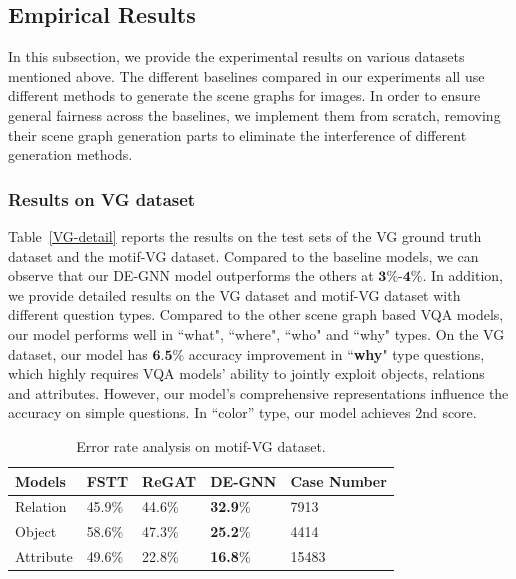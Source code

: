 \documentclass[letterpaper]{article} %
\begin{document}
\subsection{Empirical Results}
In this subsection, we provide the experimental results on various datasets mentioned above. 
The different baselines compared in our experiments all use different methods to generate the scene graphs for images. 
In order to ensure general fairness across the baselines, we implement them from scratch, removing their scene graph generation parts to eliminate the interference of different generation methods.

\subsubsection{Results on VG dataset} Table~\ref{VG-detail} reports the results on the test sets of the VG ground truth dataset and the motif-VG dataset. Compared to the baseline models, we can observe that our DE-GNN model outperforms the others at $\textbf{3\%}$-$\textbf{4\%}$. In addition, we provide detailed results on the VG dataset and motif-VG dataset with different question types. Compared to the other scene graph based VQA models, our model performs well in ``what", ``where", ``who" and ``why" types. On the VG dataset, our model has $\textbf{6.5\%}$ accuracy improvement in ``\textbf{why}" type questions, which highly requires VQA models' ability to jointly exploit objects, relations and attributes. However, our model's comprehensive representations influence the accuracy on simple questions. In ``color'' type, our model achieves 2nd score.


\begin{table}
    \begin{tabular}{llll|l}
    \hline
     \textbf{Models} & FSTT & ReGAT & DE-GNN & Case Number \\
    \hline
     Relation & 45.9\% & 44.6\% & \textbf{32.9}\% & 7913\\
     Object &58.6\% & 47.3\% & \textbf{25.2}\% & 4414\\
     Attribute & 49.6\% & 22.8\% & \textbf{16.8}\% & 15483\\
    \hline
    \end{tabular}
\caption{\label{badcase}
Error rate analysis on motif-VG dataset. 
}
\end{table} 
\end{document}
